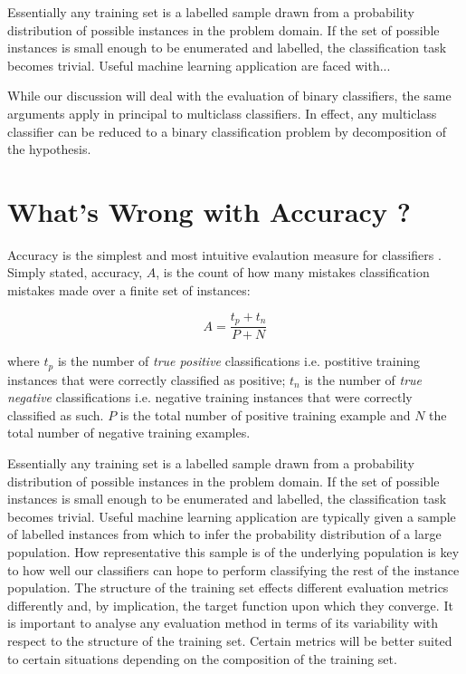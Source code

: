 \documentclass[10pt]{unbthesis}
\begin{document}
Essentially any training set is a labelled sample drawn from a
probability distribution of possible instances in the problem
domain. If the set of possible instances is small enough to be
enumerated and labelled, the classification task becomes
trivial. Useful machine learning application are faced with...

While our discussion will deal with the evaluation of binary
classifiers, the same arguments apply in principal to multiclass
classifiers. In effect, any multiclass classifier can be reduced to a
binary classification problem by decomposition of the hypothesis. 


\section*{What's Wrong with Accuracy ?}
Accuracy is the simplest and most intuitive evalaution measure for
classifiers \cite{refworks:43}. Simply stated, accuracy, \(A\), is the
count of how many mistakes classification mistakes made over a finite
set of instances:

\begin{equation}
\label{equ:accuracy}
A = \frac{t_p + t_n}{P + N}
\end{equation}

where \(t_p\) is the number of \textit{true positive} classifications
i.e. postitive training instances that were correctly classified as
positive; \(t_n\) is the number of \textit{true negative}
classifications i.e. negative training instances that were correctly
classified as such. \(P\) is the total number of positive training
example and \(N\) the total number of negative training examples.

Essentially any training set is a labelled sample drawn from a
probability distribution of possible instances in the problem
domain. If the set of possible instances is small enough to be
enumerated and labelled, the classification task becomes
trivial. Useful machine learning application are typically given a
sample of labelled instances from which to infer the probability
distribution of a large population. How representative
this sample is of the underlying population is key to how well our
classifiers can hope to perform classifying the rest of the instance
population. The structure of the training set effects different evaluation
metrics differently and, by implication, the target function upon
which they converge. It is important to analyse any evaluation method
in terms of its variability with respect to the structure of the
training set. Certain metrics will be better suited to certain
situations depending on the composition of the training set.
\end{document}

